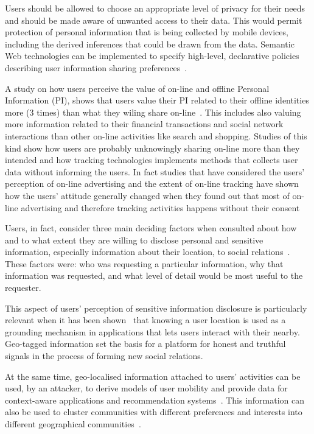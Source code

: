 Users should be allowed to choose an appropriate level of privacy for their needs and should be made aware of unwanted access to their data. This would permit protection of personal information that is being collected by mobile devices, including the derived inferences that could be drawn from the data. Semantic Web technologies can be implemented to specify high-level, declarative policies describing user information sharing preferences~\cite{jagtap2011preserving}.

A study on how users perceive the value of on-line and offline Personal Information (PI), shows that users value their PI related to their offline identities more (3 times) than what they wiling share on-line~\cite{carrascal2013your}. This includes also valuing more information related to their financial transactions and social network interactions than other on-line activities like search and shopping. Studies of this kind show how users are probably unknowingly sharing on-line more than they intended and how tracking technologies implements methods that collects user data without informing the users. In fact studies that have considered the users' perception of on-line advertising and the extent of on-line tracking have shown how the users' attitude generally changed when they found out that most of on-line advertising and therefore tracking activities happens without their consent~\cite{cranor2012can}

Users, in fact, consider three main deciding factors when consulted about how and to what extent they are willing to disclose personal and sensitive information, especially information about their location, to social relations~\cite{consolvo2005location}. These factors were: who was requesting a particular information, why that information was requested, and what level of detail would be most useful to the requester. 

This aspect of users' perception of sensitive information disclosure is particularly relevant when it has been shown~\cite{toch2013locality} that knowing a user location is used as a grounding mechanism in applications that lets users interact with their nearby. Geo-tagged information set the basis for a platform for honest and truthful signals in the process of forming new social relations.

At the same time, geo-localised information attached to users' activities can be used, by an attacker, to derive models of user mobility and provide data for context-­aware applications and recommendation systems~\cite{melia-segui-et-al}. This information can also be used to cluster communities with different preferences and interests into different geographical communities~\cite{zhu-et-al}. 

